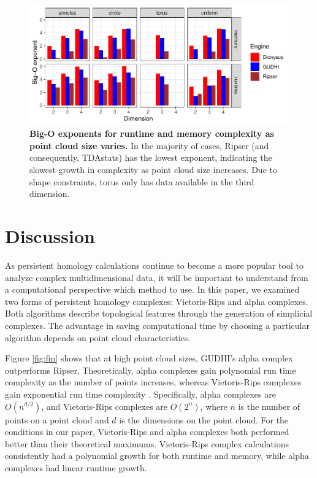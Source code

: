 \begin{Schunk}
\begin{figure}
\includegraphics{fig8.pdf} \caption{\label{fig:bigO}\textbf{Big-O exponents for runtime and memory complexity as point cloud size varies.} In the majority of cases, Ripser (and consequently, TDAstats) has the lowest exponent, indicating the slowest growth in complexity as point cloud size increases. Due to shape constraints, torus only has data available in the third dimension.}\label{fig:bigoh}
\end{figure}
\end{Schunk}

\hypertarget{discussion}{%
\section{Discussion}\label{discussion}}

As persistent homology calculations continue to become a more popular
tool to analyze complex multidimensional data, it will be important to
understand from a computational perspective which method to use. In this
paper, we examined two forms of persistent homology complexes:
Vietoris-Rips and alpha complexes. Both algorithms describe topological
features through the generation of simplicial complexes. The advantage
in saving computational time by choosing a particular algorithm depends
on point cloud characteristics.

Figure \ref{fig:fin} shows that at high point cloud sizes, GUDHI's alpha
complex outperforms Ripser. Theoretically, alpha complexes gain
polynomial run time complexity as the number of points increases, whereas
Vietoris-Rips complexes gain exponential run time complexity
\citep{roadmap}. Specifically, alpha complexes are \(O(n^{d/2})\), and
Vietoris-Rips complexes are \(O(2^n)\), where \(n\) is the number of
points on a point cloud and \(d\) is the dimensions on the point cloud.
For the conditions in our paper, Vietoris-Rips and alpha complexes both
performed better than their theoretical maximums. Vietoris-Rips complex
calculations consistently had a polynomial growth for both runtime and
memory, while alpha complexes had linear runtime growth.

